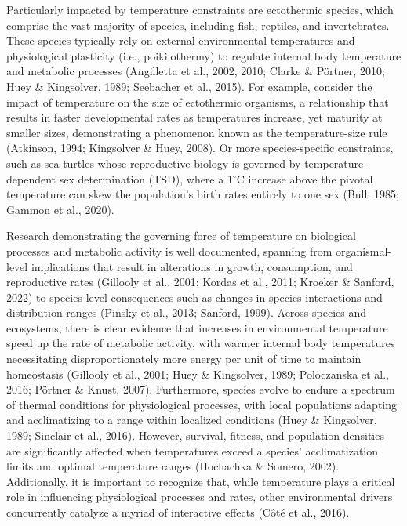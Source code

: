 \documentclass{CSUNthesis}
\begin{document}
Particularly impacted by temperature constraints are ectothermic species, which comprise the vast majority of species, including fish, reptiles, and invertebrates. These species typically rely on external environmental temperatures and physiological plasticity (i.e., poikilothermy) to regulate internal body temperature and metabolic processes (Angilletta et al., 2002, 2010; Clarke \& Pörtner, 2010; Huey \& Kingsolver, 1989; Seebacher et al., 2015). For example, consider the impact of temperature on the size of ectothermic organisms, a relationship that results in faster developmental rates as temperatures increase, yet maturity at smaller sizes, demonstrating a phenomenon known as the temperature-size rule (Atkinson, 1994; Kingsolver \& Huey, 2008). Or more species-specific constraints, such as sea turtles whose reproductive biology is governed by temperature-dependent sex determination (TSD), where a 1\(^\circ\)C increase above the pivotal temperature can skew the population's birth rates entirely to one sex (Bull, 1985; Gammon et al., 2020).

Research demonstrating the governing force of temperature on biological processes and metabolic activity is well documented, spanning from organismal-level implications that result in alterations in growth, consumption, and reproductive rates (Gillooly et al., 2001; Kordas et al., 2011; Kroeker \& Sanford, 2022) to species-level consequences such as changes in species interactions and distribution ranges (Pinsky et al., 2013; Sanford, 1999). Across species and ecosystems, there is clear evidence that increases in environmental temperature speed up the rate of metabolic activity, with warmer internal body temperatures necessitating disproportionately more energy per unit of time to maintain homeostasis (Gillooly et al., 2001; Huey \& Kingsolver, 1989; Poloczanska et al., 2016; Pörtner \& Knust, 2007). Furthermore, species evolve to endure a spectrum of thermal conditions for physiological processes, with local populations adapting and acclimatizing to a range within localized conditions (Huey \& Kingsolver, 1989; Sinclair et al., 2016). However, survival, fitness, and population densities are significantly affected when temperatures exceed a species' acclimatization limits and optimal temperature ranges (Hochachka \& Somero, 2002). Additionally, it is important to recognize that, while temperature plays a critical role in influencing physiological processes and rates, other environmental drivers concurrently catalyze a myriad of interactive effects (Côté et al., 2016).
\end{document}
